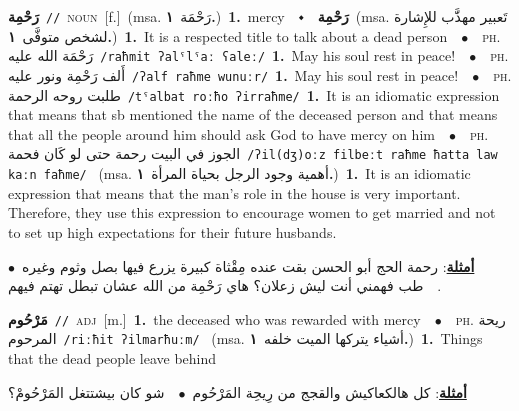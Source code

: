 \documentclass[10pt,a4paper,twoside]{article} %
\begin{document}
\begin{multicols}{2}
{\setlength\topsep{0pt}\textbf{\foreignlanguage{arabic}{رَحْمِة}}\ {\color{gray}\texttt{//}\color{black}}\ \textsc{noun}\ [f.]\ \color{gray}(msa. \foreignlanguage{arabic}{رَحْمَة}~\foreignlanguage{arabic}{\textbf{١.}})\color{black}\ \textbf{1.}~mercy\ \ $\smblkdiamond$\ \ \setlength\topsep{0pt}\textbf{\foreignlanguage{arabic}{رَحْمِة}}\ \color{gray}(msa. \foreignlanguage{arabic}{تَعبير مهذَّب للإِشارة لشخص متوفَّى}~\foreignlanguage{arabic}{\textbf{١.}})\color{black}\ \textbf{1.}~It is a respected title to talk about a dead person\ \ $\bullet$\ \ \textsc{ph.} \color{gray} \foreignlanguage{arabic}{رَحْمَة الله عليه}\color{black}\ {\color{gray}\texttt{/{\sffamily raħmit ʔalˤlˤaː ʕaleː}/}\color{black}}\ \textbf{1.}~May his soul rest in peace!\ \ $\bullet$\ \ \textsc{ph.} \color{gray} \foreignlanguage{arabic}{أَلف رَحْمِة ونور عليه}\color{black}\ {\color{gray}\texttt{/{\sffamily ʔalf raħme wunuːr}/}\color{black}}\ \textbf{1.}~May his soul rest in peace!\ \ $\bullet$\ \ \textsc{ph.} \color{gray} \foreignlanguage{arabic}{طلبت روحه الرحمة}\color{black}\ {\color{gray}\texttt{/{\sffamily tˤalbat roːħo ʔirraħme}/}\color{black}}\ \textbf{1.}~It is an idiomatic expression that means that sb mentioned the name of the deceased person and that means that all the people around him should ask God to have mercy on him\ \ $\bullet$\ \ \textsc{ph.} \color{gray} \foreignlanguage{arabic}{الجوز في البيت رحمة حتى لو كَان فحمة}\color{black}\ {\color{gray}\texttt{/{\sffamily ʔil(dʒ)oːz filbeːt raħme ħatta law kaːn faħme}/}\color{black}}\ \color{gray} (msa. \foreignlanguage{arabic}{أهمية وجود الرجل بحياة المرأة}~\foreignlanguage{arabic}{\textbf{١.}})\color{black}\ \textbf{1.}~It is an idiomatic expression that means that the man's role in the house is very important. Therefore, they use this expression to encourage women to get married and not to set up high expectations for their future husbands.\  \begin{flushright}\color{gray}\foreignlanguage{arabic}{\textbf{\underline{\foreignlanguage{arabic}{أمثلة}}}: رحمة الحج أبو الحسن بقت عنده مِقْثاة كبيرة يزرع فيها بصل وثوم وغيره\ $\bullet$\ \  طب فهمني أنت ليش زعلان؟ هاي رَحْمِة من الله عشان تبطل تهتم فيهم.}\end{flushright}\color{black}} \vspace{2mm}

{\setlength\topsep{0pt}\textbf{\foreignlanguage{arabic}{مَرْحُوم}}\ {\color{gray}\texttt{//}\color{black}}\ \textsc{adj}\ [m.]\ \textbf{1.}~the deceased who was rewarded with mercy\ \ $\bullet$\ \ \textsc{ph.} \color{gray} \foreignlanguage{arabic}{ريحة المرحوم}\color{black}\ {\color{gray}\texttt{/{\sffamily riːħit ʔilmarħuːm}/}\color{black}}\ \color{gray} (msa. \foreignlanguage{arabic}{أشياء يتركها الميت خلفه}~\foreignlanguage{arabic}{\textbf{١.}})\color{black}\ \textbf{1.}~Things that the dead people leave behind\  \begin{flushright}\color{gray}\foreignlanguage{arabic}{\textbf{\underline{\foreignlanguage{arabic}{أمثلة}}}: كل هالكعاكيش والقجج من رِيحِة المَرْحُوم\ $\bullet$\ \  شو كان بيشتتغل المَرْحُومْ؟}\end{flushright}\color{black}} \vspace{2mm}


\end{multicols}
\end{document}
